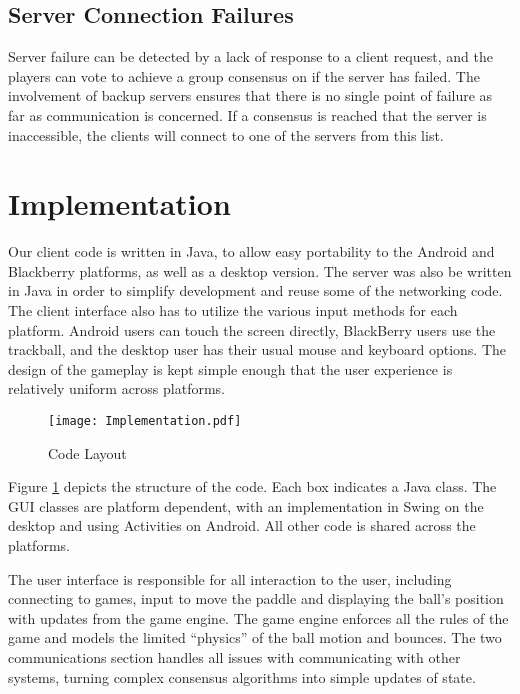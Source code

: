 \documentclass{sig-alternate}
\begin{document}
\subsection{Server Connection Failures}

Server failure can be detected by a lack of response to a client request,
and the players can vote to achieve a group consensus on if the server has
failed.  The involvement of backup servers ensures that there is no single
point of failure as far as communication is concerned.   If a consensus is
reached that the server is inaccessible, the clients will connect to one of
the servers from this list.


\section{Implementation}
\label{implementation}

Our client code is written in Java, to allow easy portability to the
Android and Blackberry platforms, as well as a desktop version.  The server
was also be written in Java in order to simplify development and reuse some
of the networking code.  The client interface also has to utilize the
various input methods for each platform.  Android users can touch the
screen directly, BlackBerry users use the trackball, and the desktop user
has their usual mouse and keyboard options.  The design of the gameplay is
kept simple enough that the user experience is relatively uniform across
platforms.

\begin{figure}[htb]
	\label{code layout}
	\begin{center}
		\texttt{[image: Implementation.pdf]}
		\caption{Code Layout}
	\end{center}
\end{figure}


Figure \ref{implementation} depicts the structure of the code.  Each box
indicates a Java class.  The GUI classes are platform dependent, with an
implementation in Swing on the desktop and using Activities on Android.
All other code is shared across the platforms.

The user interface is responsible for all interaction to the user,
including connecting to games, input to move the paddle and displaying the
ball's position with updates from the game engine.  The game engine
enforces all the rules of the game and models the limited ``physics'' of
the ball motion and bounces.  The two communications section handles all
issues with communicating with other systems, turning complex consensus
algorithms into simple updates of state.
\end{document}
